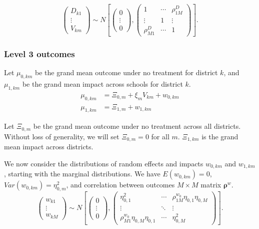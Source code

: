 \documentclass[12pt]{article}
\newcommand\mb[1]{\boldsymbol{#1}}
\begin{document}
\[ \left(
\begin{array}{c}
D_{k1}	\\
\vdots 	\\
V_{km}
\end{array}\right)
\sim
N\left[\left(
\begin{array}{c}
0		\\
\vdots 	\\
0
\end{array}\right),\left(
\begin{array}{ccc}
1 				& \cdots	& \rho^D_{1M}	\\
\vdots 			& 1			& \vdots 	\\
\rho^D_{M1}  	& \cdots	& 1
\end{array}
\right)\right].\]

\subsubsection{Level 3 outcomes}
\label{sec:level3_outcomes}

Let $\mu_{0,km}$ be the grand mean outcome under no treatment for district $k$, and
$\mu_{1,km}$ be the grand mean impact across schools for district $k$.
\begin{align}
\mu_{0,km} 	&= \Xi_{0,m} + \xi_{m} V_{km} + w_{0,km}  \\
\mu_{1,km} 	&= \Xi_{1,m} + w_{1,km}
\end{align}

Let $\Xi_{0,m}$ be the grand mean outcome under no treatment across all districts.
Without loss of generality, we will set $\Xi_{0,m} = 0$ for all $m$.
$\Xi_{1,km}$ is the grand mean impact across districts.

We now consider the distributions of random effects and impacts $w_{0,km}$ and $w_{1,km}$, starting with the marginal distributions.
We have $E(w_{0,km}) = 0$, $Var(w_{0,km}) = \eta_{0,m}^2$, and correlation between outcomes $M \times M$ matrix $\mb{\rho}^w$.
\[ \left(
\begin{array}{c}
w_{k1}	\\
\vdots 	\\
w_{kM}
\end{array}\right)
\sim
N\left[\left(
\begin{array}{c}
0		\\
\vdots 	\\
0
\end{array}\right),\left(
\begin{array}{ccc}
\eta_{0,1}^2						& \cdots		& \rho^{w_0}_{1M} \eta_{0,1} \eta_{0,M}	\\
\vdots 								& \ddots		& \vdots 	\\
\rho^{w_0}_{M1} \eta_{0,M} \eta_{0,1}  	& \cdots		& \eta_{0,M}^2
\end{array}
\right)\right].\]
\end{document}

